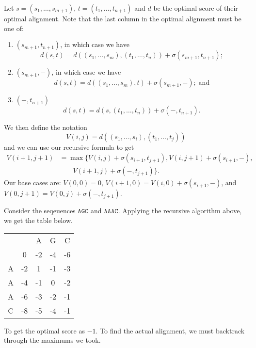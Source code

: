 \begin{algorithm}
	Let $s = (s_1, \ldots, s_{m+1})$, $t = (t_1, \ldots, t_{n+1})$ and $d$ be the
	optimal score of their optimal alignment.
	Note that the last column in the optimal alignment must be one of:
	\begin{enumerate}
		\item $(s_{m+1}, t_{n+1})$, in which case we have
			\[
				d(s, t) = d((s_1,\ldots,s_m), (t_1, \ldots, t_n))
					+ \sigma(s_{m+1}, t_{n+1});
			\]
		\item $(s_{m+1}, -)$, in which case we have
			\[
				d(s,t) = d((s_1, \ldots, s_m), t) + \sigma(s_{m+1},-);
				\;\text{and}
			\]
		\item $(-, t_{n+1})$
			\[
				d(s,t) = d(s, (t_1,\ldots,t_n)) + \sigma(-, t_{n+1}).
			\]
	\end{enumerate}
	We then define the notation
	\[
		V(i,j) = d((s_1, \ldots, s_i), (t_1, \ldots, t_j))
	\]
	and we can use our recursive formula to get
	\begin{align*}
		V(i+1, j+1) &=
		\max\{
			V(i,j) + \sigma(s_{i+1}, t_{j+1}),
			V(i,j+1) + \sigma(s_{i+1},-), \\
			&\qquad V(i+1,j) + \sigma(-,t_{j+1})
		\}.
	\end{align*}
	Our base cases are: $V(0,0) = 0$, $V(i+1,0) = V(i,0) + \sigma(s_{i+1}, -)$,
	and $V(0, j+1) = V(0,j) + \sigma(-, t_{j+1})$.
\end{algorithm}

\begin{example}[]
	Consider the seqeuences $\mathtt{AGC}$ and $\mathtt{AAAC}$.
	Applying the recursive algorithm above, we get the table below.
	\begin{center}
		\ttfamily
		\begin{tabular}{ccccc}
			& & A & G & C \\
			& 0 & -2 & -4 & -6 \\
			A & -2 & 1 & -1 & -3 \\
			A & -4 & -1 & 0 & -2 \\
			A & -6 & -3 & -2 & -1 \\
			C & -8 & -5 & -4 & -1
		\end{tabular}
	\end{center}
	To get the optimal score as $-1$.
	To find the actual alignment, we must backtrack through the maximums we took.
\end{example}

